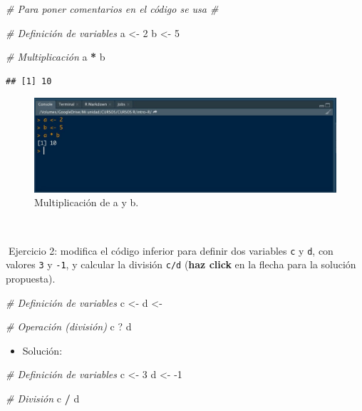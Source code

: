 \documentclass[11pt,]{book}
\newenvironment{Shaded}{\begin{snugshade}}{\end{snugshade}}
\newcommand{\CommentTok}[1]{\textcolor[rgb]{0.37,0.37,0.37}{\textit{#1}}}
\newcommand{\DecValTok}[1]{\textcolor[rgb]{0.06,0.06,0.06}{#1}}
\newcommand{\NormalTok}[1]{#1}
\newcommand{\OperatorTok}[1]{\textcolor[rgb]{0.43,0.43,0.43}{\textbf{#1}}}
\newcommand{\StringTok}[1]{\textcolor[rgb]{0.5,0.5,0.5}{#1}}
\providecommand{\tightlist}{%
  \setlength{\itemsep}{0pt}\setlength{\parskip}{0pt}}
\begin{document}
\begin{Shaded}
\begin{Highlighting}[]
\CommentTok{# Para poner comentarios en el código se usa #}

\CommentTok{# Definición de variables}
\NormalTok{a <-}\StringTok{ }\DecValTok{2}
\NormalTok{b <-}\StringTok{ }\DecValTok{5}

\CommentTok{# Multiplicación}
\NormalTok{a }\OperatorTok{*}\StringTok{ }\NormalTok{b}
\end{Highlighting}
\end{Shaded}

\begin{verbatim}
## [1] 10
\end{verbatim}

\begin{figure}

{\centering \includegraphics[width=0.8\linewidth]{./img/consola_multiplicacion} 

}

\caption{Multiplicación de a y b.}\label{fig:unnamed-chunk-4}
\end{figure}

~

📝Ejercicio 2: modifica el código inferior para definir dos variables \texttt{c} y \texttt{d}, con valores \texttt{3} y \texttt{-1}, y calcular la división \texttt{c/d} (\textbf{haz click} en la flecha para la solución propuesta).

\begin{Shaded}
\begin{Highlighting}[]
\CommentTok{# Definición de variables}
\NormalTok{c <-}\StringTok{ }
\NormalTok{d <-}

\CommentTok{# Operación (división)}
\NormalTok{c ? d}
\end{Highlighting}
\end{Shaded}

\begin{itemize}
\tightlist
\item
  Solución:
\end{itemize}

\begin{Shaded}
\begin{Highlighting}[]
\CommentTok{# Definición de variables}
\NormalTok{c <-}\StringTok{ }\DecValTok{3}
\NormalTok{d <-}\StringTok{ }\DecValTok{-1}

\CommentTok{# División}
\NormalTok{c }\OperatorTok{/}\StringTok{ }\NormalTok{d}
\end{Highlighting}
\end{Shaded}
\end{document}
